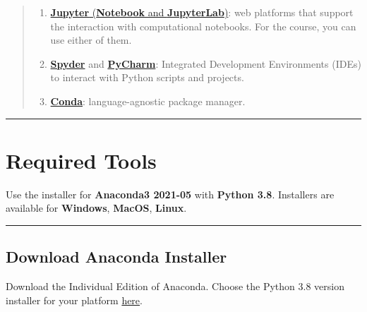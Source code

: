 \documentclass{latex-template/tufte-handout}
\begin{document}
\begin{quote}
\begin{enumerate}
\item
  \href{https://jupyter.org}{\textbf{Jupyter} (\textbf{Notebook} and
  \textbf{JupyterLab})}: web platforms that support the interaction with
  computational notebooks. For the course, you can use either of them.
\item
  \href{https://www.spyder-ide.org}{\textbf{Spyder}} and
  \href{https://www.jetbrains.com/pycharm/}{\textbf{PyCharm}}:
  Integrated Development Environments (IDEs) to interact with Python
  scripts and projects.
\item
  \href{https://docs.conda.io/en/latest/}{\textbf{Conda}}:
  language-agnostic package manager.
\end{enumerate}
\end{quote}


\begin{center}\rule{\linewidth}{0.5pt}\end{center}

\section{Required Tools}

Use the installer for \textbf{Anaconda3 2021-05} with \textbf{Python
3.8}.%
Installers are available for \textbf{Windows}, \textbf{MacOS}, \textbf{Linux}.\\

\begin{center}\rule{\linewidth}{0.5pt}\end{center}


\subsection{Download Anaconda Installer}\label{download-anaconda-installer}

Download the Individual Edition of Anaconda. Choose the Python 3.8
version installer for your platform \href{https://repo.anaconda.com/archive/}{here}.
\end{document}
